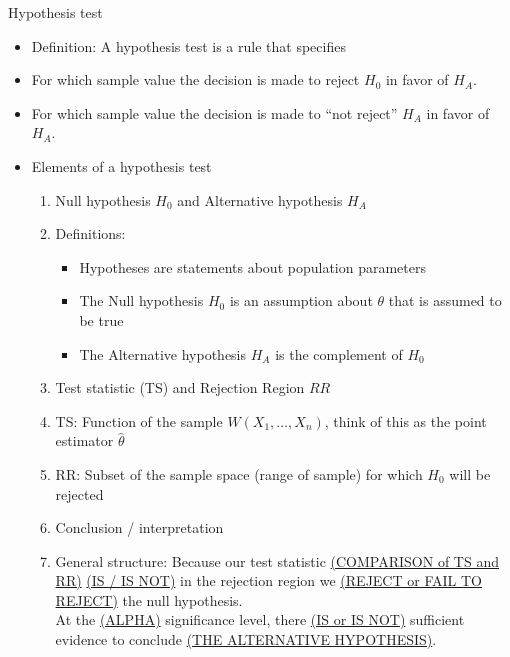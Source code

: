 \documentclass{article}
\newcommand{\vecn}[2]{#1_1, \ldots, #1_{#2}}	%
\newcommand{\ho}{H_0}		%
\newcommand{\ha}{H_A}		%
\begin{document}
Hypothesis test
\begin{itemize}
    \item Definition: A hypothesis test is a rule that specifies
    \item[] For which sample value the decision is made to reject $\ho$ in favor of $\ha$.
    \item[] For which sample value the decision is made to ``not reject'' $\ha$ in favor of $\ha$.
    \item Elements of a hypothesis test
    \begin{enumerate}
        \item Null hypothesis $\ho$ and Alternative hypothesis $\ha$
        \item[] Definitions:
        \begin{itemize}
            \item Hypotheses are statements about population parameters
            \item The Null hypothesis $\ho$ is an assumption about $\theta$ that is assumed to be true
            \item The Alternative hypothesis $\ha$ is the complement of $\ho$
        \end{itemize}
        \item Test statistic (TS) and Rejection Region $RR$
        \item[] TS: Function of the sample $W(\vecn{X}{n})$, think of this as the point estimator $\hat{\theta}$
        \item[] RR: Subset of the sample space (range of sample) for which $\ho$ will be rejected
        \item Conclusion / interpretation
        \item[] General structure: Because our test statistic \ul{(COMPARISON of TS and RR)} \ul{(IS / IS NOT)} in the rejection region we \ul{(REJECT or FAIL TO REJECT)} the null hypothesis. \\ At the \ul{(ALPHA)} significance level, there \ul{(IS or IS NOT)} sufficient evidence to conclude \ul{(THE ALTERNATIVE HYPOTHESIS)}.
    \end{enumerate}
\end{itemize}\bigskip
\end{document}
